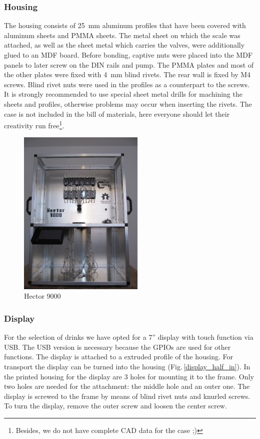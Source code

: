 \documentclass[a4paper]{scrartcl}
\begin{document}
\subsubsection{Housing}
The housing consists of \SI{25}{\milli\metre} aluminum profiles that have been covered with aluminum sheets and PMMA sheets. The metal sheet on which the scale was attached, as well as the sheet metal which carries the valves, were additionally glued to an MDF board. Before bonding, captive nuts were placed into the MDF panels to later screw on the DIN rails and pump. The PMMA plates and most of the other plates were fixed with \SI{4}{\milli\metre} blind rivets. The rear wall is fixed by M4 screws. Blind rivet nuts were used in the profiles as a counterpart to the screws. It is strongly recommended to use special sheet metal drills for machining the sheets and profiles, otherwise problems may occur when inserting the rivets. The case is not included in the bill of materials, here everyone should let their creativity run free\footnote{Besides, we do not have complete CAD data for the case ;)}.

\begin{figure}
  \centering
  \includegraphics[height=8cm]{pics/hector9000.JPG}
  \caption{Hector 9000} \label{hector9000}
\end{figure}

\subsubsection{Display}
For the selection of drinks we have opted for a 7'' display with touch function via USB. The USB version is necessary because the GPIOs are used for other functions. The display is attached to a extruded profile of the housing. For transport the display can be turned into the housing (Fig.\,\ref{display_half_in}). In the printed housing for the display are 3 holes for mounting it to the frame. Only two holes are needed for the attachment: the middle hole and an outer one. The display is screwed to the frame by means of blind rivet nuts and knurled screws. To turn the display, remove the outer screw and loosen the center screw.
\end{document}
